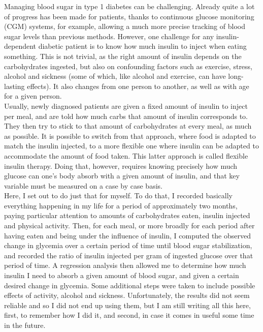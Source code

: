 Managing blood sugar in type 1 diabetes can be challenging.
Already quite a lot of progress has been made for patients, thanks to continuous glucose monitoring (CGM) systems, for example, allowing a much more precise tracking of blood sugar levels than previous methods.
However, one challenge for any insulin-dependent diabetic patient is to know how much insulin to inject when eating something.
This is not trivial, as the right amount of insulin depends on the carbohydrates ingested, but also on confounding factors such as exercise, stress, alcohol and sickness (some of which, like alcohol and exercise, can have long-lasting effects).
It also changes from one person to another, as well as with age for a given person.\\

Usually, newly diagnosed patients are given a fixed amount of insulin to inject per meal, and are told how much carbs that amount of insulin corresponds to.
They then try to stick to that amount of carbohydrates at every meal, as much as possible.
It is possible to switch from that approach, where food is adapted to match the insulin injected, to a more flexible one where insulin can be adapted to accommodate the amount of food taken.
This latter approach is called flexible insulin therapy. 
Doing that, however, requires knowing precisely how much glucose can one's body absorb with a given amount of insulin, and that key variable must be measured on a case by case basis.\\

Here, I set out to do just that for myself.
To do that, I recorded basically everything happening in my life for a period of approximately two months, paying particular attention to amounts of carbohydrates eaten, insulin injected and physical activity.
Then, for each meal, or more broadly for each period after having eaten and being under the influence of insulin, I computed the observed change in glycemia over a certain period of time until blood sugar stabilization, and recorded the ratio of insulin injected per gram of ingested glucose over that period of time.
A regression analysis then allowed me to determine how much insulin I need to absorb a given amount of blood sugar, and given a certain desired change in glycemia.
Some additional steps were taken to include possible effects of activity, alcohol and sickness.
Unfortunately, the results did not seem reliable and so I did not end up using them, but I am still writing all this here, first, to remember how I did it, and second, in case it comes in useful some time in the future.